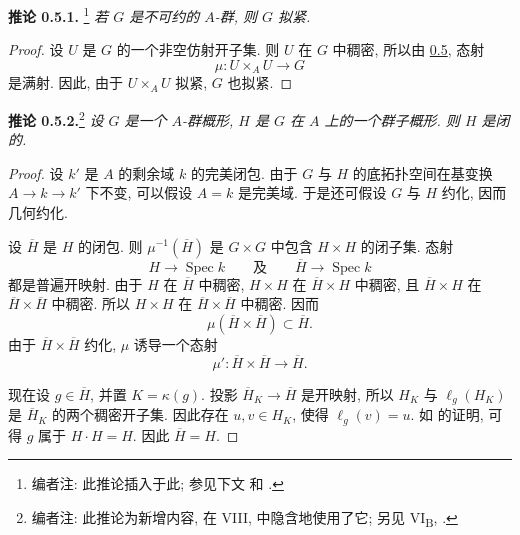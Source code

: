 \medskip
\noindent\textbf{推论 0.5.1.}
\footnote{编者注: 此推论插入于此;
参见下文  和
.}
\label{sga3:VIA:0.5.1}
\textit{若 \(G\) 是不可约的 \(A\)-群, 则 \(G\) 拟紧.}

\begin{proof}
设 \(U\) 是 \(G\) 的一个非空仿射开子集.
则 \(U\) 在 \(G\) 中稠密, 所以由 \hyperref[sga3:VIA:0.5]{0.5}, 态射
\[
  \mu:U\times_A U\longrightarrow G
\]
是满射. 因此, 由于 \(U\times_A U\) 拟紧, \(G\) 也拟紧.
\end{proof}

\medskip
\noindent\textbf{推论 0.5.2.}\footnote{编者注: 此推论为新增内容,
在 VIII,  中隐含地使用了它;
另见 VI\textsubscript{B}, .}
\label{sga3:VIA:0.5.2}
\textit{设 \(G\) 是一个 \(A\)-群概形,
\(H\) 是 \(G\) 在 \(A\) 上的一个群子概形. 则 \(H\) 是闭的.}

\begin{proof}
设 \(k'\) 是 \(A\) 的剩余域 \(k\) 的完美闭包.
由于 \(G\) 与 \(H\) 的底拓扑空间在基变换
\(A\to k\to k'\) 下不变, 可以假设 \(A=k\) 是完美域.
于是还可假设 \(G\) 与 \(H\) 约化, 因而几何约化.

设 \(\overline H\) 是 \(H\) 的闭包.
则 \(\mu^{-1}(\overline H)\) 是 \(G\times G\) 中包含
\(H\times H\) 的闭子集. 态射
\[
  H\longrightarrow\operatorname{Spec}k
  \qquad\text{及}\qquad
  \overline H\longrightarrow\operatorname{Spec}k
\]
都是普遍开映射.
由于 \(H\) 在 \(\overline H\) 中稠密,
\(H\times H\) 在 \(\overline H\times H\) 中稠密,
且 \(\overline H\times H\) 在
\(\overline H\times\overline H\) 中稠密.
所以 \(H\times H\) 在 \(\overline H\times\overline H\) 中稠密. 因而
\[
  \mu(\overline H\times\overline H)\subset\overline H.
\]
由于 \(\overline H\times\overline H\) 约化, \(\mu\) 诱导一个态射
\[
  \mu':\overline H\times\overline H\longrightarrow\overline H.
\]

现在设 \(g\in\overline H\), 并置 \(K=\kappa(g)\).
投影 \(\overline H_K\to\overline H\) 是开映射,
所以 \(H_K\) 与 \(\ell_g(H_K)\) 是
\(\overline H_K\) 的两个稠密开子集.
因此存在 \(u,v\in H_K\), 使得 \(\ell_g(v)=u\).
如  的证明,
可得 \(g\) 属于 \(H\cdot H=H\). 因此 \(\overline H=H\).
\end{proof}


